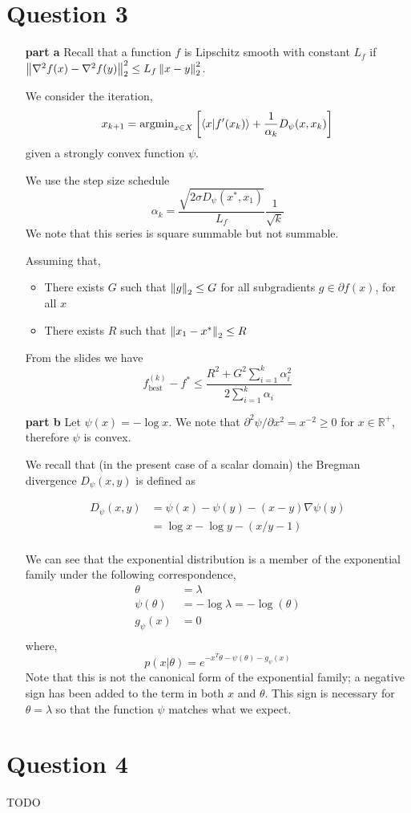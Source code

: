 \documentclass{article}
\begin{document}
\section{Question 3}

\begin{enumerate}
\item[\bf part a]
  Recall that a function $f$ is Lipschitz smooth with constant $L_f$
  if $\left\lVert \nabla^2 f(x) - \nabla^2 f(y) \right\rVert_2^2 \le L_f \left\lVert x-y \right\rVert_2^2$.

  We consider the iteration,
  \[ x_{k+1} = \mathrm{argmin}_{x \in X} \left[ \braket{x \vert f'(x_k)} + \frac{1}{\alpha_k}
      D_\psi(x, x_k) \right] \]
  given a strongly convex function $\psi$.

  We use the step size schedule
  \[ \alpha_k = \frac{\sqrt{2 \sigma D_\psi(x^*, x_1)}}{L_f} \frac{1}{\sqrt k} \]
  We note that this series is square summable but not summable.

  Assuming that,

  \begin{itemize}
  \item There exists $G$ such that $\left\lVert g \right\rVert_2 \le G$ for all
    subgradients $g \in \partial f(x)$, for all $x$
  \item There exists $R$ such that $\left\lVert x_1 - x^* \right\rVert_2 \le R$
  \end{itemize}

  From the slides we have
  \[ f_\mathrm{best}^{(k)} - f^* \le \frac{R^2 + G^2 \sum_{i=1}^k \alpha_i^2}{2\sum_{i=1}^k \alpha_i}  \]


\item[\bf part b]
  Let $\psi(x) = - \log x$. We note that $\partial^2\psi / \partial
  x^2 = x^{-2} \ge 0$ for $x \in \mathbb{R}^+$, therefore $\psi$ is
  convex.

  We recall that (in the present case of a scalar domain) the Bregman
  divergence $D_\psi (x,y)$ is defined as

  \begin{align*}
    D_\psi (x,y) & = \psi(x) - \psi(y) - (x-y) \nabla\psi(y) \\
                & = \log x - \log y - (x/y - 1) \\
  \end{align*}

  We can see that the exponential distribution is a member of the
  exponential family under the following correspondence,
  \begin{align*}
    \theta & = \lambda \\
    \psi(\theta) & = -\log \lambda = -\log(\theta) \\
    g_\psi(x) & = 0 \\
  \end{align*}
  where,
  \[ p(x \vert \theta) = e^{-x^T \theta - \psi(\theta) - g_\psi(x)} \]
  Note that this is not the canonical form of the exponential family;
a negative sign has been added to the term in both $x$ and
$\theta$. This sign is necessary for $\theta = \lambda$ so that the
function $\psi$ matches what we expect.
\end{enumerate}

\section{Question 4}

TODO
\end{document}
